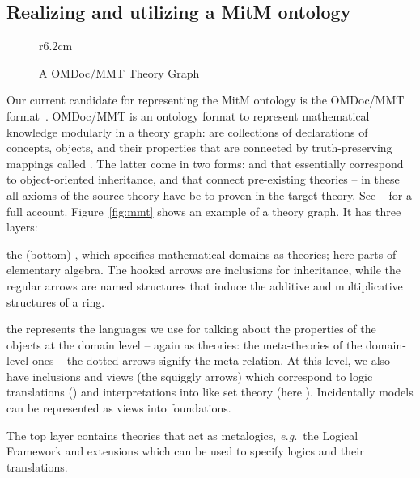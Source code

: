 \subsection{Realizing and utilizing a MitM ontology}

\begin{wrapfigure}r{6.2cm}\centering\vspace*{-2em}
  \vspace*{-.5em}
  \caption{A OMDoc/MMT Theory Graph}\label{fig:mmt}\vspace*{-1em}
  \label{figure.omdoc.example}
\end{wrapfigure}
Our current candidate for representing the MitM ontology is the OMDoc/MMT
format~\cite{Kohlhase:OMDoc1.2,MMTSVN:on}. OMDoc/MMT is an ontology format to
represent mathematical knowledge modularly in a theory graph:  are
collections of declarations of concepts, objects, and their properties that are connected
by truth-preserving mappings called . The latter come in two
forms:  and  that essentially correspond to
object-oriented inheritance, and  that connect pre-existing theories -- in
these all axioms of the source theory have be to proven in the target theory. See
~\cite{RabKoh:WSMSML13} for a full account. Figure~\ref{fig:mmt} shows an example of a
theory graph. It has three layers:
\begin{compactenum}[\em i\rm)]
\item the (bottom) , which specifies mathematical domains as theories; here
  parts of elementary algebra. The hooked arrows are inclusions for inheritance, while the
  regular arrows are named structures that induce the additive and multiplicative
  structures of a ring.
\item the  represents the languages we use for talking about the
  properties of the objects at the domain level -- again as theories: the meta-theories of
  the domain-level ones -- the dotted arrows signify the meta-relation. At this level, we
  also have inclusions and views (the squiggly arrows) which correspond to logic
  translations () and interpretations into  like
  set theory (here ). Incidentally models can be represented as views into
  foundations.
\item The top layer contains theories that act as metalogics, \emph{e.g.}\ the Logical Framework
   and extensions which can be used to specify logics and their translations.
\end{compactenum}
